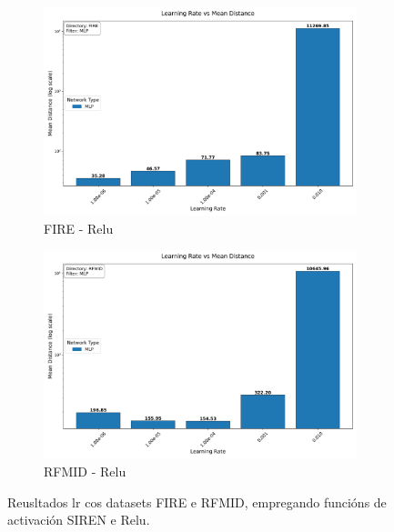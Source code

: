\begin{figure}[ht]
\begin{subfigure}[b]{0.45\textwidth}
        \includegraphics[width=\textwidth]{imaxes/grid_search_lr_FIRE_MLP.png}
        \caption{FIRE - Relu}
        \label{fig:grid_search_lr_FIRE_MLP}
    \end{subfigure}\hfill
    \begin{subfigure}[b]{0.45\textwidth}
        \includegraphics[width=\textwidth]{imaxes/grid_search_lr_RFMID_MLP.png}
        \caption{RFMID - Relu}
        \label{fig:grid_search_lr_RFMID_MLP}
    \end{subfigure}
    \caption{Reusltados lr cos datasets FIRE e RFMID, empregando funcións de activación SIREN e Relu.}
    \label{fig:grid_search_lr}
\end{figure}


